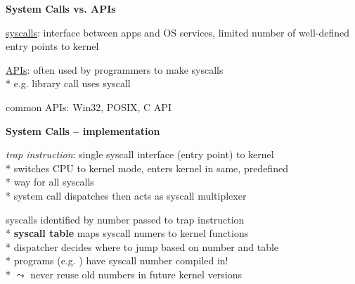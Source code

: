 \textbf{System Calls vs. APIs}
\begin{items}
	\item \underline{syscalls}: interface between apps and OS services, limited number of well-defined entry points to kernel
	\item \underline{APIs}: often used by programmers to make syscalls \\*
		e.g.  library call uses  syscall
	\item common APIs: Win32, POSIX, C API
\end{items}

\textbf{System Calls -- implementation}
\begin{items}
	\item \emph{trap instruction}: single syscall interface (entry point) to kernel \\*
		switches CPU to kernel mode, enters kernel in same, predefined \\* \phantom{x} way for all syscalls \\*
		system call dispatches then acts as syscall multiplexer
	\item syscalls identified by number passed to trap instruction \\*
		\textbf{syscall table} maps syscall numers to kernel functions \\*
		dispatcher decides where to jump based on number and table \\*
		programs (e.g. ) have syscall number compiled in! \\*
		\( \leadsto \) never reuse old numbers in future kernel versions
\end{items}

